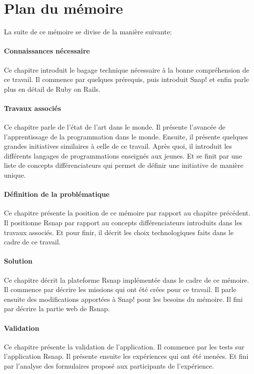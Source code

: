 \section{Plan du mémoire}
La suite de ce mémoire se divise de la manière suivante:

\paragraph{Connaissances nécessaire}
Ce chapitre introduit le bagage technique nécessaire à la bonne compréhension de ce travail. Il commence par quelques prérequis, puis introduit Snap! et enfin parle plus en détail de Ruby on Rails.

\paragraph{Travaux associés}
Ce chapitre parle de l'état de l'art dans le monde. Il présente l'avancée de l'apprentissage de la programmation dans le monde. Ensuite, il présente quelques grandes initiatives similaires à celle de ce travail. Après quoi, il introduit les différents langages de programmations enseignés aux jeunes. Et se finit par une liste de concepts différenciateurs qui permet de définir une initiative de manière unique.

\paragraph{Définition de la problématique}
Ce chapitre présente la position de ce mémoire par rapport au chapitre précédent. Il positionne \gls{Rsnap} par rapport au concepts différenciateurs introduits dans les travaux associés. Et pour finir, il décrit les choix technologiques faits dans le cadre de ce travail.

\paragraph{Solution}
Ce chapitre décrit la plateforme \gls{Rsnap} implémentée dans le cadre de ce mémoire.
Il commence par décrire les missions qui ont été crées pour ce travail. Il parle ensuite des modifications apportées à Snap! pour les besoins du mémoire. Il fini par décrire la partie web de \gls{Rsnap}.

\paragraph{Validation}
Ce chapitre présente la validation de l'application. Il commence par les tests sur l'application \gls{Rsnap}. Il présente ensuite les expériences qui ont été menées. Et fini par l'analyse des formulaires proposé aux participants de l'expérience.

